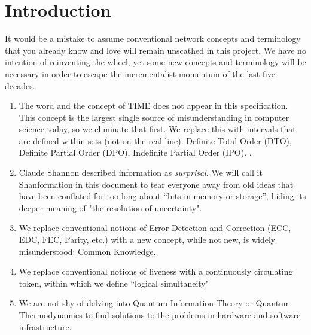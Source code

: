 \section{Introduction}

It would be a mistake to assume conventional network concepts and terminology that you already know and love will remain unscathed in this project. We have no intention of reinventing the wheel, yet some new concepts and terminology will be necessary in order to escape the incrementalist momentum of the last five decades. %


\begin{enumerate}
\item The word and the concept of TIME does not appear in this specification. This concept is the largest single source of misunderstanding in computer science today, so we  eliminate that first. 
We replace this with intervals that are defined within sets (not on the real line).  Definite Total Order (DTO), Definite Partial Order (DPO), Indefinite Partial Order (IPO). . 
\item 	 Claude Shannon described information as \emph{surprisal}.  We will call it Shanformation in this document to tear everyone away from old ideas that have been conflated for too long about ``bits in memory or storage'', hiding its deeper meaning of "the resolution of uncertainty".
\item 	We replace conventional notions of  Error Detection and Correction (ECC, EDC, FEC, Parity, etc.) with a new concept, while not new, is widely misunderstood: Common Knowledge.
\item 	We replace conventional notions of liveness with  a continuously circulating token, within which we define ``logical simultaneity"
\item		We are not shy of delving into Quantum Information Theory or Quantum Thermodynamics to find solutions to the problems in hardware and software infrastructure.
\end{enumerate}

